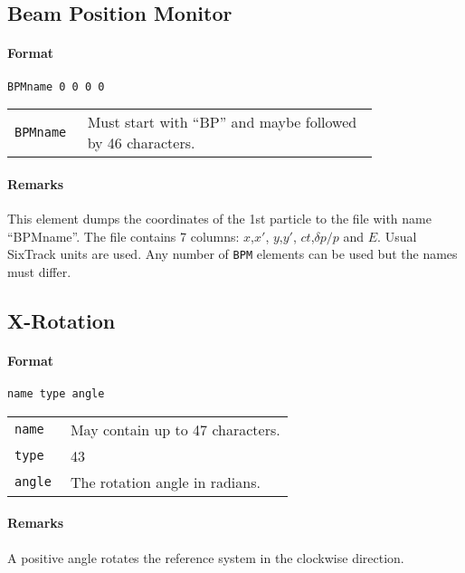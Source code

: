 \subsection{Beam Position Monitor} \label{BPM}

\paragraph{Format} \texttt{BPMname 0 0 0 0}

\bigskip
\begin{tabular}{@{}lp{0.8\linewidth}}
    \texttt{BPMname} & Must start with ``BP'' and maybe followed by 46 characters.
\end{tabular}

\paragraph{Remarks}
This element dumps the coordinates of the 1st particle to the file with name ``BPMname''.
The file contains 7 columns: $x$,$x'$, $y$,$y'$, $ct$,$\delta p/p$ and $E$.
Usual SixTrack units are used.
Any number of \texttt{BPM} elements can be used but the names must differ.
\subsection{X-Rotation} \label{x-rotation}

\paragraph{Format} \texttt{name type angle}

\bigskip
\begin{tabular}{@{}lp{0.8\linewidth}}
    \texttt{name}  & May contain up to 47 characters. \\
    \texttt{type}  & 43 \\
    \texttt{angle} & The rotation angle in radians.  
\end{tabular}
\paragraph{Remarks}
A positive angle rotates the reference system in the clockwise direction.
